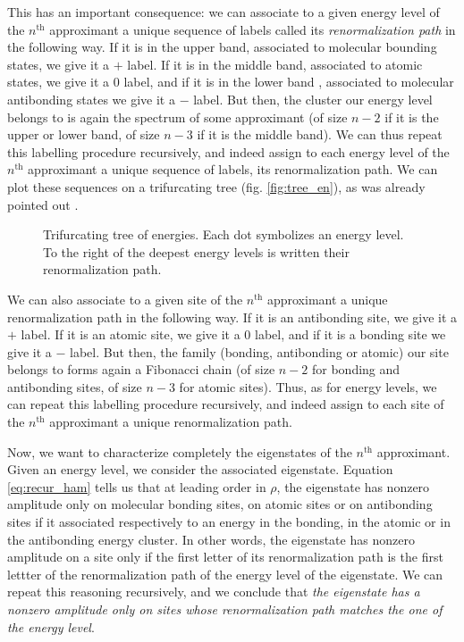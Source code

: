 \documentclass[aps,prl,preprint]{revtex4-1}
\begin{document}
This has an important consequence: we can associate to a given energy level of the $n^\text{th}$ approximant a unique sequence of labels called its \emph{renormalization path} in the following way.
If it is in the upper band, associated to molecular bounding states, we give it a $+$  label.
If it is in the middle band, associated to atomic states, we give it a $0$ label, and if it is in the lower band , associated to molecular antibonding states we give it a $-$ label.
But then, the cluster our energy level belongs to is again the spectrum of some approximant (of size $n-2$ if it is the upper or lower band, of size $n-3$ if it is the middle band). We can thus repeat this labelling procedure recursively, and indeed assign to each energy level of the $n^\text{th}$ approximant a unique sequence of labels, its renormalization path.
We can plot these sequences on a trifurcating tree (fig. \eqref{fig:tree_en}), as was already pointed out \cite{KaluginKitaevLevitov} \cite{Piechon95}.

\begin{figure}[htp]
    
\caption{Trifurcating tree of energies. Each dot symbolizes an energy level. To the right of the deepest energy levels is written their renormalization path.}
\label{fig:tree_en}
\end{figure}

We can also associate to a given site of the $n^\text{th}$ approximant a unique renormalization path in the following way.
If it is an antibonding site, we give it a $+$  label.
If it is an atomic site, we give it a $0$ label, and if it is a bonding site we give it a $-$ label.
But then, the family (bonding, antibonding or atomic) our site belongs to forms again a Fibonacci chain (of size $n-2$ for bonding and antibonding sites, of size $n-3$ for atomic sites). 
Thus, as for energy levels, we can repeat this labelling procedure recursively, and indeed assign to each site of the $n^\text{th}$ approximant a unique renormalization path.

Now, we want to characterize completely the eigenstates of the $n^\text{th}$ approximant. 
Given an energy level, we consider the associated eigenstate. 
Equation  \eqref{eq:recur_ham} tells us that at leading order in $\rho$, the eigenstate has nonzero amplitude only on molecular bonding sites, on atomic sites or on antibonding sites if it associated respectively to an energy in the bonding, in the atomic or in the antibonding energy cluster.
In other words, the eigenstate has nonzero amplitude on a site only if the first letter of its renormalization path is the first lettter of the renormalization path of the energy level of the eigenstate.
We can repeat this reasoning recursively, and we conclude that \emph{the eigenstate has a nonzero amplitude only on sites whose renormalization path matches the one of the energy level}.
\end{document}
